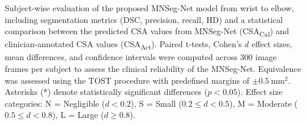  \begin{table}[H]
\centering
\caption{Subject-wise evaluation of the proposed MNSeg-Net model from wrist to elbow, including segmentation metrics (DSC, precision, recall, HD) and a statistical comparison between the predicted CSA values from MNSeg-Net (CSA\textsubscript{Cal}) and clinician-annotated CSA values (CSA\textsubscript{Act}). Paired t-tests, Cohen’s \(d\) effect sizes, mean differences, and confidence intervals were computed across 300 image frames per subject to assess the clinical reliability of the MNSeg-Net. Equivalence was assessed using the TOST procedure with predefined margins of \(\pm 0.5~\mathrm{mm}^2\). Asterisks (*) denote statistically significant differences (\(p < 0.05\)). Effect size categories: N = Negligible (\(d < 0.2\)), S = Small (\(0.2 \leq d < 0.5\)), M = Moderate (\(0.5 \leq d < 0.8\)), L = Large (\(d \geq 0.8\)).}


\end{table}
